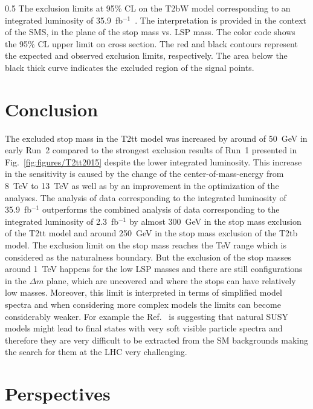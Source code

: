                  {0.5}       %
                 { The exclusion limits at 95\% CL on the T2bW model corresponding to an integrated luminosity of 35.9~fb$^{-1}$~\cite{Sirunyan:2017xse}. The interpretation is provided in the context of the SMS, in the plane of the stop mass vs. LSP mass. The color code shows the 95\% CL upper limit on cross section. The red and black contours represent the expected and observed exclusion limits, respectively. The area below the black thick curve indicates the excluded region of the signal points.  }

\section{Conclusion}

The excluded stop mass in the T2tt model was increased by around of 50~GeV in early Run~2 compared to the strongest exclusion results of Run~1 presented in Fig.~\ref{fig:figures/T2tt2015} despite the lower integrated luminosity. This increase in the sensitivity is caused by the change of the center-of-mass-energy from 8~TeV to 13~TeV as well as by an improvement in the optimization of the analyses. The analysis of data corresponding to the integrated luminosity of 35.9~fb$^{-1}$ outperforms the combined analysis of data corresponding to the integrated luminosity of 2.3~fb$^{-1}$ by almost 300~GeV in the stop mass exclusion of the T2tt model and around 250~GeV in the stop mass exclusion of the T2tb model. The exclusion limit on the stop mass reaches the TeV range which is considered as the naturalness boundary. But the exclusion of the stop masses around 1~TeV happens for the low LSP masses and there are still configurations in the $\Delta m$ plane, which are uncovered and where the stops can have relatively low masses. Moreover, this limit is interpreted in terms of simplified model spectra and when considering more complex models the limits can become considerably weaker. For example the Ref.~\cite{Baer:2012uy} is suggesting that natural SUSY models might lead to final states with very soft visible particle spectra and therefore they are very difficult to be extracted from the SM backgrounds making the search for them at the LHC very challenging.%


\newpage

\section{Perspectives}

